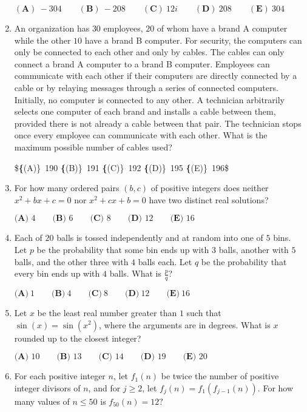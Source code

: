 \documentclass{article}
\begin{document}
\begin{enumerate}[label=\arabic*., itemsep=0.5em]
$(\textbf{A})\: {-}304\qquad(\textbf{B}) \: {-}208\qquad(\textbf{C}) \: 12i\qquad(\textbf{D}) \: 208\qquad(\textbf{E}) \: 304$\par \vspace{0.5em}\item An organization has $30$ employees, $20$ of whom have a brand A computer while the other $10$ have a brand B computer. For security, the computers can only be connected to each other and only by cables. The cables can only connect a brand A computer to a brand B computer. Employees can communicate with each other if their computers are directly connected by a cable or by relaying messages through a series of connected computers. Initially, no computer is connected to any other. A technician arbitrarily selects one computer of each brand and installs a cable between them, provided there is not already a cable between that pair. The technician stops once every employee can communicate with each other. What is the maximum possible number of cables used?

\$\textbf\{(A)\}\ 190  \qquad\textbf\{(B)\}\  191 \qquad\textbf\{(C)\}\  192 \qquad\textbf\{(D)\}\
 195 \qquad\textbf\{(E)\}\ 196\$\par \vspace{0.5em}\item For how many ordered pairs $(b,c)$ of positive integers does neither $x^2+bx+c=0$ nor $x^2+cx+b=0$ have two distinct real solutions?

$\textbf{(A) } 4 \qquad \textbf{(B) } 6 \qquad \textbf{(C) } 8 \qquad \textbf{(D) } 12 \qquad \textbf{(E) } 16 \qquad$\par \vspace{0.5em}\item Each of $20$ balls is tossed independently and at random into one of $5$ bins. Let $p$ be the probability that some bin ends up with $3$ balls, another with $5$ balls, and the other three with $4$ balls each. Let $q$ be the probability that every bin ends up with $4$ balls. What is $\frac{p}{q}$?

$\textbf{(A)}\ 1 \qquad\textbf{(B)}\  4 \qquad\textbf{(C)}\  8 \qquad\textbf{(D)}\  12 \qquad\textbf{(E)}\ 16$\par \vspace{0.5em}\item Let $x$ be the least real number greater than $1$ such that $\sin(x) = \sin(x^2)$, where the arguments are in degrees. What is $x$ rounded up to the closest integer?

$\textbf{(A) } 10 \qquad \textbf{(B) } 13 \qquad \textbf{(C) } 14 \qquad \textbf{(D) } 19 \qquad \textbf{(E) } 20$\par \vspace{0.5em}\item For each positive integer $n$, let $f_1(n)$ be twice the number of positive integer divisors of $n$, and for $j \ge 2$, let $f_j(n) = f_1(f_{j-1}(n))$. For how many values of $n \le 50$ is $f_{50}(n) = 12?$


\end{enumerate}
\end{document}
